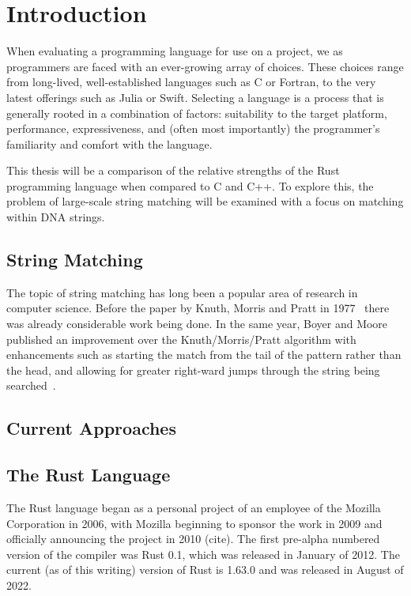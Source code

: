 \section{Introduction}
\label{sec:introduction}

When evaluating a programming language for use on a project, we as programmers are faced with an ever-growing array of choices. These choices range from long-lived, well-established languages such as C or Fortran, to the very latest offerings such as Julia or Swift. Selecting a language is a process that is generally rooted in a combination of factors: suitability to the target platform, performance, expressiveness, and (often most importantly) the programmer's familiarity and comfort with the language.

This thesis will be a comparison of the relative strengths of the Rust programming language when compared to C and C++. To explore this, the problem of large-scale string matching will be examined with a focus on matching within DNA strings.

\subsection{String Matching}

The topic of string matching has long been a popular area of research in computer science. Before the paper by Knuth, Morris and Pratt in 1977~\cite{knuth.morris.pratt.1977} there was already considerable work being done. In the same year, Boyer and Moore published an improvement over the Knuth/Morris/Pratt algorithm with enhancements such as starting the match from the tail of the pattern rather than the head, and allowing for greater right-ward jumps through the string being searched~\cite{boyer.moore.1977}.

\subsection{Current Approaches}

\subsection{The Rust Language}

The Rust language began as a personal project of an employee of the Mozilla Corporation in 2006, with Mozilla beginning to sponsor the work in 2009 and officially announcing the project in 2010 (cite). The first pre-alpha numbered version of the compiler was Rust 0.1, which was released in January of 2012. The current (as of this writing) version of Rust is 1.63.0 and was released in August of 2022.

